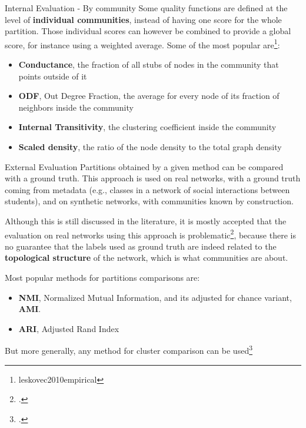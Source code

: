 \begin{textbox}{Internal Evaluation - By community}
    Some quality functions are defined at the level of \textbf{individual communities}, instead of having one score for the whole partition. Those individual scores can however be combined to provide a global score, for instance using a weighted average. Some of the most popular are\footnote{leskovec2010empirical}:
    \begin{itemize}
        \item \textbf{Conductance}, the fraction of all stubs of nodes in the community that points outside of it
        \item \textbf{ODF}, Out Degree Fraction, the average for every node of its fraction of neighbors inside the community
        \item \textbf{Internal Transitivity}, the clustering coefficient inside the community
        \item \textbf{Scaled density}, the ratio of the node density to the total graph density
    \end{itemize}
\end{textbox}

\begin{textbox}{External Evaluation}
    Partitions obtained by a given method can be compared with a ground truth. This approach is used on real networks, with a ground truth coming from metadata (e.g., classes in a network of social interactions between students), and on synthetic networks, with communities known by construction.

    Although this is still discussed in the literature, it is mostly accepted that the evaluation on real networks using this approach is problematic\footcite{peel2017ground}, because there is no guarantee that the labels used as ground truth are indeed related to the \textbf{topological structure} of the network, which is what communities are about.

    Most popular methods for partitions comparisons are:
    \begin{itemize}
        \item \textbf{NMI}, Normalized Mutual Information, and its adjusted for chance variant, \textbf{AMI}.
        \item \textbf{ARI}, Adjusted Rand Index
    \end{itemize}
    But more generally, any method for cluster comparison can be used\footcite{dao2020community}
\end{textbox}


